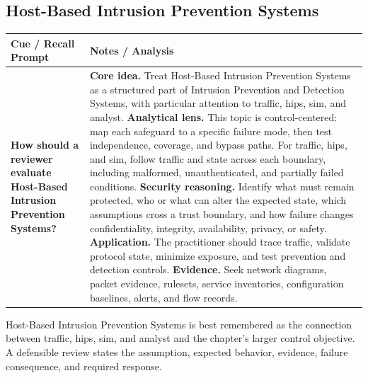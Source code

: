 \documentclass[11pt]{article}
\newcommand{\CornellHeader}{%
\rowcolor{Navy}\color{white}\bfseries Cue / Recall Prompt & \color{white}\bfseries Notes / Analysis\\\hline}
\newcommand{\CornellRow}[2]{%
\cellcolor{CueGray}\RaggedRight\textbf{#1} & \RaggedRight #2\\\hline}
\begin{document}
\subsection*{Host-Based Intrusion Prevention Systems}
\begin{longtable}{>{\RaggedRight\arraybackslash}p{}|>{\RaggedRight\arraybackslash}p{}}
\CornellHeader
\CornellRow{How should a reviewer evaluate Host-Based Intrusion Prevention Systems?}{\textbf{Core idea.} Treat Host-Based Intrusion Prevention Systems as a structured part of Intrusion Prevention and Detection Systems, with particular attention to traffic, hips, sim, and analyst. \textbf{Analytical lens.} This topic is control-centered: map each safeguard to a specific failure mode, then test independence, coverage, and bypass paths. For traffic, hips, and sim, follow traffic and state across each boundary, including malformed, unauthenticated, and partially failed conditions. \textbf{Security reasoning.} Identify what must remain protected, who or what can alter the expected state, which assumptions cross a trust boundary, and how failure changes confidentiality, integrity, availability, privacy, or safety. \textbf{Application.} The practitioner should trace traffic, validate protocol state, minimize exposure, and test prevention and detection controls. \textbf{Evidence.} Seek network diagrams, packet evidence, rulesets, service inventories, configuration baselines, alerts, and flow records.}
\end{longtable}
\begin{topicsummary}
Host-Based Intrusion Prevention Systems is best remembered as the connection between traffic, hips, sim, and analyst and the chapter's larger control objective. A defensible review states the assumption, expected behavior, evidence, failure consequence, and required response.
\end{topicsummary}
\end{document}
